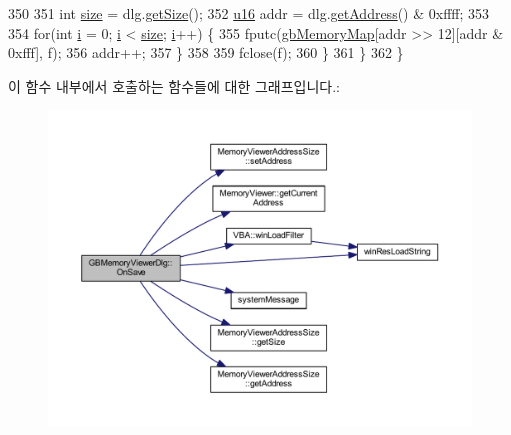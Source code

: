 \begin{DoxyCode}
350 
351       \textcolor{keywordtype}{int} \mbox{\hyperlink{expr-lex_8cpp_ab7d671599a7b25ca99a487fa341bc33a}{size}} = dlg.\mbox{\hyperlink{class_memory_viewer_address_size_ade3cfceb89cd35954e57d10dba882eb1}{getSize}}();
352       \mbox{\hyperlink{_system_8h_a9e6c91d77e24643b888dbd1a1a590054}{u16}} addr = dlg.\mbox{\hyperlink{class_memory_viewer_address_size_a3d31492056e5b255aa882f7732671c4c}{getAddress}}() & 0xffff;
353 
354       \textcolor{keywordflow}{for}(\textcolor{keywordtype}{int} \mbox{\hyperlink{expr-lex_8cpp_acb559820d9ca11295b4500f179ef6392}{i}} = 0; \mbox{\hyperlink{expr-lex_8cpp_acb559820d9ca11295b4500f179ef6392}{i}} < \mbox{\hyperlink{expr-lex_8cpp_ab7d671599a7b25ca99a487fa341bc33a}{size}}; \mbox{\hyperlink{expr-lex_8cpp_acb559820d9ca11295b4500f179ef6392}{i}}++) \{
355         fputc(\mbox{\hyperlink{gb_globals_8cpp_a71edbb615a1ec7c5b134e660531dd7dd}{gbMemoryMap}}[addr >> 12][addr & 0xfff], f);
356         addr++;
357       \}
358 
359       fclose(f);
360     \}
361   \}
362 \}
\end{DoxyCode}
이 함수 내부에서 호출하는 함수들에 대한 그래프입니다.\+:
\nopagebreak
\begin{figure}[H]
\begin{center}
\leavevmode
\includegraphics[width=350pt]{class_g_b_memory_viewer_dlg_abea90b70d9579272367ed561fe796b01_cgraph}
\end{center}
\end{figure}
\mbox{\label{class_g_b_memory_viewer_dlg_a4e089b7216a76ba514f26f061f53fd8c}} 

